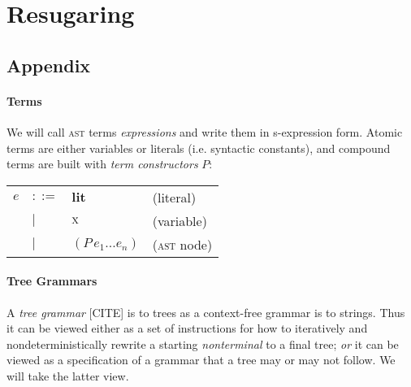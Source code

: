 \documentclass[
  10pt,
  paper=letter,
  footinclude=true,
  headinclude=true,
  american
]{scrbook}
\makeatletter
\newenvironment{Table}
  {\begin{center}\begin{tabular}{l l l @{\quad}l}}
  {\end{tabular}\end{center}}
\renewcommand{\<}{\le}
\makeatother
\begin{document}
\part{Resugaring}


%





\chapter{Appendix}


\newcommand{\lit}[1]{\textbf{#1}}
\newcommand{\expr}[2]{(#1\,#2)}
\newcommand{\var}[1]{\textrm{\textsc{#1}}}

\newcommand{\exprs}[3]{(#1\,#2\,#3^{*})}
\newcommand{\production}[2]{#1 \leftarrow #2}
\newcommand{\saysG}[3]{#1 \vdash #2\,:\,#3}

\newcommand{\SaysScopeCheck}[6]{#1 \vdash #2 : #3 ; #4 ; #5 ; #6}


\subsection{Terms}

We will call \textsc{ast} terms \emph{expressions} and write them in
s-expression form. Atomic terms are either variables or literals
(i.e. syntactic constants), and compound terms are built with
\emph{term constructors} $P$:

\begin{Table}
  $e$
  &$::=$& $\lit{lit}$ &(literal) \\
  &$|$&   $\var{x}$ &(variable) \\
  &$|$&   $\expr{P}{e_1 ... e_n}$ &(\textsc{ast} node)
\end{Table}

\subsection{Tree Grammars}

A \emph{tree grammar} [CITE] is to trees as a context-free grammar is
to strings. Thus it can be viewed either as a set of instructions for
how to iteratively and nondeterministically rewrite a starting
\emph{nonterminal} to a final tree; \emph{or} it can be viewed as a
specification of a grammar that a tree may or may not follow. We will
take the latter view.
\end{document}

